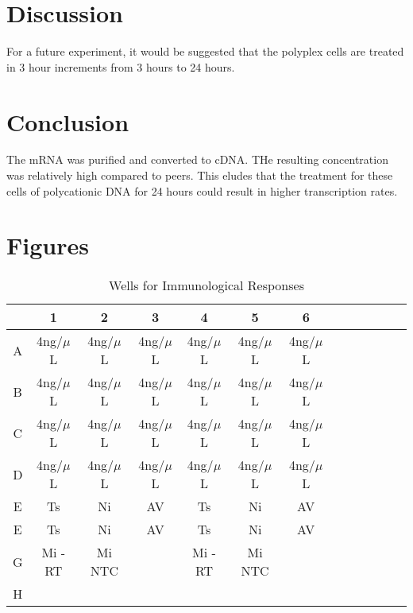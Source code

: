 \documentclass[journal, a4paper]{IEEEtran}
\begin{document}
\section{Discussion}

For a future experiment, it would be suggested that the polyplex cells are treated in 3 hour increments from 3 hours to 24 hours.

\section{Conclusion}
The mRNA was purified and converted to cDNA. THe resulting concentration was relatively high compared to peers. This eludes that the
treatment for these cells of polycationic DNA for 24 hours could result in higher transcription rates.

\section{Figures}
  \begin{table}[!hbt]
    \begin{center}
    \caption{Wells for Immunological Responses}
    \label{tab:simParameters}
    \begin{tabular}{|c|c|c|c|c|c|c|c|c|c|c|c|c|}
      \hline
      & 1 & 2 & 3 & 4 & 5 & 6\\
      \hline
      A & 4ng/$\mu$L & 4ng/$\mu$L & 4ng/$\mu$L & 4ng/$\mu$L & 4ng/$\mu$L & 4ng/$\mu$L\\
      \hline
      B & 4ng/$\mu$L & 4ng/$\mu$L & 4ng/$\mu$L & 4ng/$\mu$L & 4ng/$\mu$L & 4ng/$\mu$L\\
      \hline
      C & 4ng/$\mu$L & 4ng/$\mu$L & 4ng/$\mu$L & 4ng/$\mu$L & 4ng/$\mu$L & 4ng/$\mu$L\\
      \hline
      D & 4ng/$\mu$L & 4ng/$\mu$L & 4ng/$\mu$L & 4ng/$\mu$L & 4ng/$\mu$L & 4ng/$\mu$L\\
      \hline
      E & Ts & Ni & AV & Ts & Ni & AV\\
      \hline
      E & Ts & Ni & AV & Ts & Ni & AV\\
      \hline
      G & Mi -RT & Mi NTC & & Mi -RT & Mi NTC & \\
      \hline
      H & & & & & &\\
      \hline
    \end{tabular}
    \end{center}
  \end{table}
\end{document}
